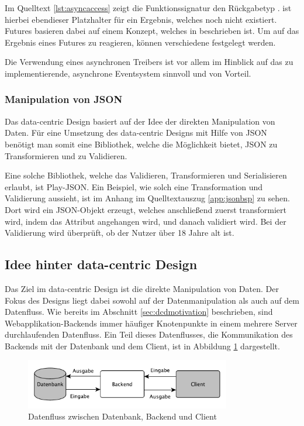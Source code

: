 Im Quelltext \ref{lst:asyncaccess} zeigt die Funktionssignatur den Rückgabetyp .  ist hierbei ebendieser Platzhalter für ein Ergebnis, welches noch nicht existiert. Futures basieren dabei auf einem Konzept, welches in \cite{future-concept} beschrieben ist. Um auf das Ergebnis eines Futures zu reagieren, können verschiedene  festgelegt werden.

Die Verwendung eines asynchronen Treibers ist vor allem im Hinblick auf das zu implementierende, asynchrone \gls{Eventsystem} sinnvoll und von Vorteil. 

\subsubsection{Manipulation von JSON}
Das data-centric Design basiert auf der Idee der direkten Manipulation von Daten. Für eine Umsetzung des data-centric Designs mit Hilfe von JSON benötigt man somit eine Bibliothek, welche die Möglichkeit bietet, JSON zu Transformieren und zu Validieren.
 
Eine solche Bibliothek, welche das Validieren, Transformieren und Serialisieren erlaubt, ist Play-JSON. Ein Beispiel, wie solch eine Transformation und Validierung aussieht, ist im Anhang im Quelltextauszug \ref{app:jsonbsp} zu sehen. Dort wird ein JSON-Objekt erzeugt, welches anschließend zuerst transformiert wird, indem das Attribut  angehangen wird, und danach validiert wird. Bei der Validierung wird überprüft, ob der Nutzer über 18 Jahre alt ist.

\subsection{Idee hinter data-centric Design}
Das Ziel im data-centric Design ist die direkte Manipulation von Daten. Der Fokus des Designs liegt dabei sowohl auf der Datenmanipulation als auch auf dem Datenfluss. Wie bereits im Abschnitt \ref{sec:dcdmotivation} beschrieben, sind Webapplikation-\gls{Backend}s immer häufiger Knotenpunkte in einem mehrere Server durchlaufenden Datenfluss. Ein Teil dieses Datenflusses, die Kommunikation des \gls{Backend}s mit der Datenbank und dem Client, ist in Abbildung \ref{fig:dataflow} dargestellt. 

\begin{figure}[h]   
  \centering     
  \includegraphics[width=0.8\textwidth]{img/dataflow_dcd.pdf}  
   \caption{Datenfluss zwischen Datenbank, \gls{Backend} und Client \protect\footnotemark}   
  \label{fig:dataflow} 
\end{figure}

